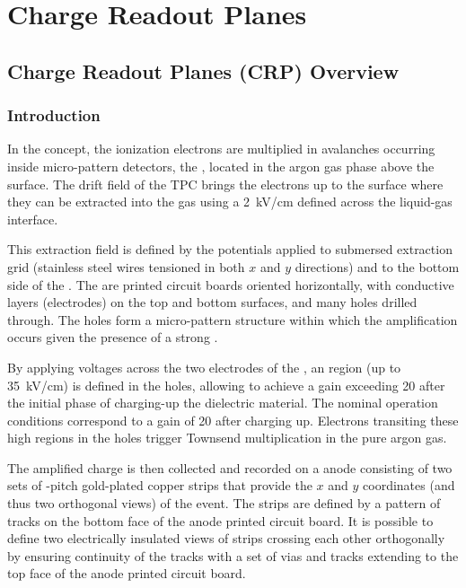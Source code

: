 \chapter{Charge Readout Planes}
\label{ch:fddp-CRP}

\section{Charge Readout Planes (CRP) Overview}
\label{sec:fddp-crp-ov}


\subsection{Introduction}
\label{sec:fddp-crp-intro}

In the \dual \lartpc concept, the ionization electrons are multiplied in avalanches  occurring inside micro-pattern detectors, the , located in the argon gas phase above the \lar %
surface. The drift field of the TPC brings the electrons up to the \lar surface where they can  be    extracted into the gas using a 
\SI{2}{kV/cm} \efield defined across the liquid-gas interface.

This extraction field is defined by the potentials applied to submersed extraction grid (stainless steel wires tensioned in both $x$ and $y$ directions) and to the bottom side of the . The  are printed circuit boards oriented horizontally, with conductive layers (electrodes) on the top and bottom surfaces, and many holes drilled through.  The holes form a micro-pattern structure within which the amplification occurs given the presence of a strong \efield.

By applying voltages across the two electrodes of the , an \efield region (up to \SI{35}{kV/cm}) is defined in the holes, allowing to achieve a gain exceeding \num{20} after the initial phase of  charging-up the  dielectric material. The nominal operation conditions correspond to a gain of \num{20} after charging up. Electrons transiting these high \efield regions in the holes trigger Townsend multiplication in the pure argon gas.

The amplified charge is then collected and recorded on a \twod anode consisting of two sets of \dpstrippitch-pitch gold-plated copper strips that provide the $x$ and $y$ coordinates (and thus two orthogonal views) of the event. The strips are defined by a pattern of tracks on the bottom face of the anode printed circuit board. It is possible  to define two electrically insulated views of strips crossing each other orthogonally by ensuring continuity of the tracks with a set of vias and tracks extending to the top face of the anode printed circuit board.

